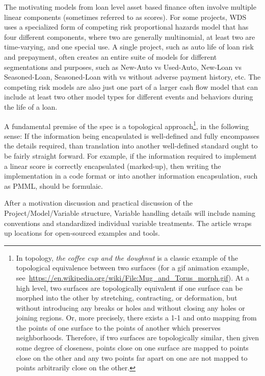 \documentclass[10pt]{article}
\begin{document}
The motivating models from loan level asset based finance often involve multiple linear components (sometimes referred to as scores).  For
some projects, WDS uses a specialized form of competing risk proportional hazards model that has four different components, where two are
generally multinomial, at least two are time-varying, and one special use.  A single project, such as auto life of loan risk and prepayment,
often creates an entire suite of models for different segmentations and purposes, such as New-Auto vs Used-Auto, New-Loan vs Seasoned-Loan,
Seasoned-Loan with vs without adverse payment history, etc.  The competing risk models are also just one part of a larger cash flow model
that can include at least two other model types for different events and behaviors during the life of a loan.

A fundamental premise of the spec is a  topological approach\footnote{In topology, {\em the coffee cup and the
doughnut} is a classic example of the topological equivalence between two surfaces (for a gif animation example,
see~\url{https://en.wikipedia.org/wiki/File:Mug\_and\_Torus\_morph.gif}).  At a high level, two surfaces are topologically equivalent if one
surface can be morphed into the other by stretching, contracting, or deformation, but without introducing any breaks or holes and without
closing any holes or joining regions. Or, more precisely, there exists a 1-1 and onto mapping from the points of one surface to the points of another which
preserves neighborhoods.  Therefore, if two surfaces are topologically similar, then given some degree of closeness, points close on one
surface are mapped to points close on the other and any two points far apart on one are not mapped to points arbitrarily close on the
other.}, in the following sense:  If the information being
encapsulated is well-defined and fully encompasses the details required, than translation into another well-defined standard ought to be
fairly straight forward.  For example, if the information required to implement a linear score is correctly encapsulated (marked-up),
then writing the implementation in a code format or into another information encapsulation, such as PMML, should be formulaic.

After a motivation discussion and practical discussion of the Project/Model/Variable structure, Variable handling details will
include naming conventions and standardized individual variable treatments.  The article wraps up locations for open-sourced examples and
tools.
\end{document}
